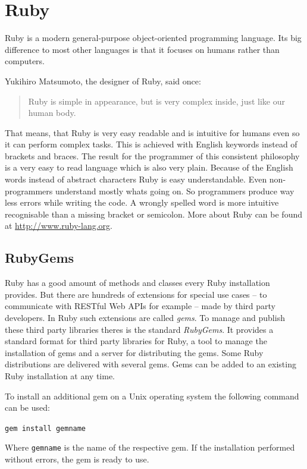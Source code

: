 \section{Ruby}
Ruby is a modern general-purpose object-oriented programming language. Its big difference to most other languages is that it focuses on humans rather than computers. 

Yukihiro Matsumoto, the designer of Ruby, said once:
\begin{quote}
Ruby is simple in appearance, but is very
complex inside, just like our human body.\cite{ruby:talk}
\end{quote}

That means, that Ruby is very easy readable and is intuitive for humans even so it can perform complex tasks. This is achieved with English keywords instead of brackets and braces. The result for the programmer of this consistent philosophy is a very easy to read language which is also very plain. Because of the English words instead of abstract characters Ruby is easy understandable. Even non-programmers understand mostly whats going on. So programmers produce way less errors while writing the code. A wrongly spelled word is more intuitive recognisable than a missing bracket or semicolon. \cite{ruby:about} More about Ruby can be found at \url{http://www.ruby-lang.org}.

\subsection{RubyGems}
Ruby has a good amount of methods and classes every Ruby installation provides. But there are hundreds of extensions for special use cases – to communicate with RESTful Web APIs for example – made by third party developers. In Ruby such extensions are called \emph{gems}. To manage and publish these third party libraries theres is the standard \emph{RubyGems}. It provides a standard format for third party libraries for Ruby, a tool to manage the installation of gems and a server for distributing the gems. \cite{ruby:gemdev} Some Ruby distributions are delivered with several gems. Gems can be added to an existing Ruby installation at any time. 

To install an additional gem on a Unix operating system the following command can be used:  
\begin{center}
\texttt{gem install gemname}
\end{center}
Where \texttt{gemname} is the name of the respective gem. If the installation performed without errors, the gem is ready to use. \cite{ruby:gemdoc}

